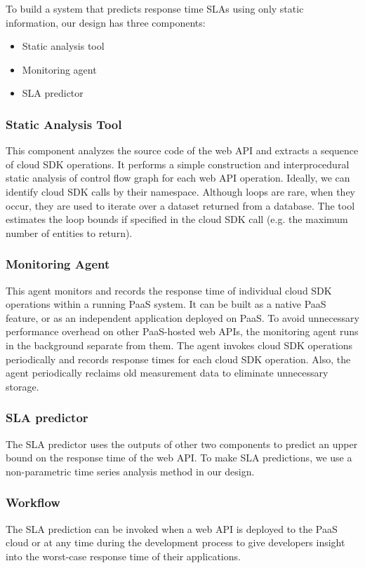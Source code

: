 \documentclass[11pt]{article}
\begin{document}
To build a system that predicts response time SLAs using only static information, our design has three components:
\begin{itemize}
\item Static analysis tool
\item Monitoring agent
\item SLA predictor
\end{itemize}

\subsubsection{Static Analysis Tool}
This component analyzes the source code of the web API and extracts a sequence of cloud SDK operations. It performs a simple
construction and interprocedural static analysis of control flow graph for each web API operation. Ideally, we can identify cloud SDK
calls by their namespace.
Although loops are rare, when they occur, they are used to iterate over a dataset returned from a database. The tool estimates the loop 
bounds if specified in the cloud SDK call (e.g. the maximum number of entities to return).

\subsubsection{Monitoring Agent}
This agent monitors and records the response time of individual cloud SDK operations within a running PaaS system. It can be built as
a native PaaS feature, or as an independent application deployed on PaaS. To avoid unnecessary performance overhead on other PaaS-hosted
web APIs, the monitoring agent runs in the background separate from them.
The agent invokes cloud SDK operations periodically and records response times for each cloud SDK operation. Also, the agent periodically
reclaims old measurement data to eliminate unnecessary storage.

\subsubsection{SLA predictor}
The SLA predictor uses the outputs of other two components to predict an upper bound on the response time of the web API.
To make SLA predictions, we use a non-parametric time series analysis method in our design.

\subsubsection{Workflow}
The SLA prediction can be invoked when a web API is deployed to the PaaS cloud or at any time during the development process to give
developers insight into the worst-case response time of their applications.
\end{document}
